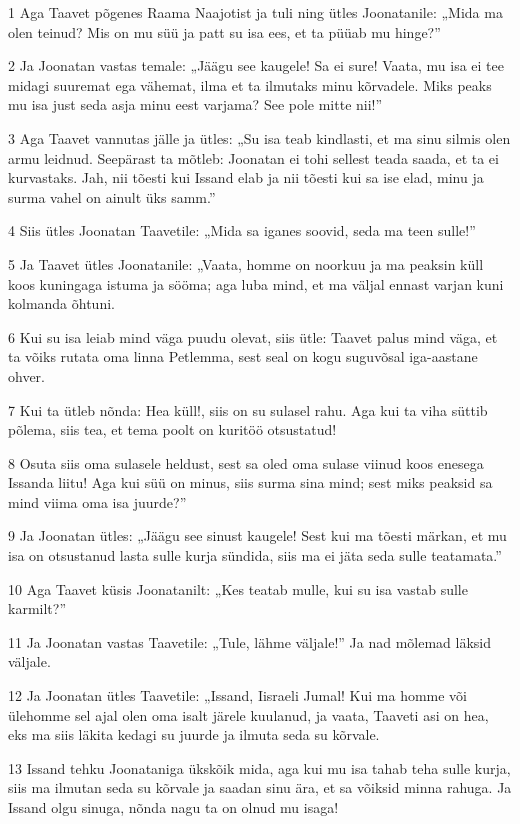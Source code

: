 \par 1 Aga Taavet põgenes Raama Naajotist ja tuli ning ütles Joonatanile: „Mida ma olen teinud? Mis on mu süü ja patt su isa ees, et ta püüab mu hinge?”
\par 2 Ja Joonatan vastas temale: „Jäägu see kaugele! Sa ei sure! Vaata, mu isa ei tee midagi suuremat ega vähemat, ilma et ta ilmutaks minu kõrvadele. Miks peaks mu isa just seda asja minu eest varjama? See pole mitte nii!”
\par 3 Aga Taavet vannutas jälle ja ütles: „Su isa teab kindlasti, et ma sinu silmis olen armu leidnud. Seepärast ta mõtleb: Joonatan ei tohi sellest teada saada, et ta ei kurvastaks. Jah, nii tõesti kui Issand elab ja nii tõesti kui sa ise elad, minu ja surma vahel on ainult üks samm.”
\par 4 Siis ütles Joonatan Taavetile: „Mida sa iganes soovid, seda ma teen sulle!”
\par 5 Ja Taavet ütles Joonatanile: „Vaata, homme on noorkuu ja ma peaksin küll koos kuningaga istuma ja sööma; aga luba mind, et ma väljal ennast varjan kuni kolmanda õhtuni.
\par 6 Kui su isa leiab mind väga puudu olevat, siis ütle: Taavet palus mind väga, et ta võiks rutata oma linna Petlemma, sest seal on kogu suguvõsal iga-aastane ohver.
\par 7 Kui ta ütleb nõnda: Hea küll!, siis on su sulasel rahu. Aga kui ta viha süttib põlema, siis tea, et tema poolt on kuritöö otsustatud!
\par 8 Osuta siis oma sulasele heldust, sest sa oled oma sulase viinud koos enesega Issanda liitu! Aga kui süü on minus, siis surma sina mind; sest miks peaksid sa mind viima oma isa juurde?”
\par 9 Ja Joonatan ütles: „Jäägu see sinust kaugele! Sest kui ma tõesti märkan, et mu isa on otsustanud lasta sulle kurja sündida, siis ma ei jäta seda sulle teatamata.”
\par 10 Aga Taavet küsis Joonatanilt: „Kes teatab mulle, kui su isa vastab sulle karmilt?”
\par 11 Ja Joonatan vastas Taavetile: „Tule, lähme väljale!” Ja nad mõlemad läksid väljale.
\par 12 Ja Joonatan ütles Taavetile: „Issand, Iisraeli Jumal! Kui ma homme või ülehomme sel ajal olen oma isalt järele kuulanud, ja vaata, Taaveti asi on hea, eks ma siis läkita kedagi su juurde ja ilmuta seda su kõrvale.
\par 13 Issand tehku Joonataniga ükskõik mida, aga kui mu isa tahab teha sulle kurja, siis ma ilmutan seda su kõrvale ja saadan sinu ära, et sa võiksid minna rahuga. Ja Issand olgu sinuga, nõnda nagu ta on olnud mu isaga!
